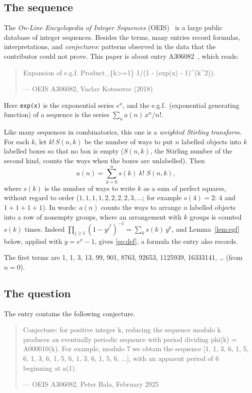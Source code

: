 \documentclass[11pt,a4paper]{article}
\theoremstyle{definition}
\theoremstyle{remark}
\begin{document}
\subsection{The sequence}\label{sec:sequence}
The \emph{On-Line Encyclopedia of Integer Sequences} (OEIS)~\cite{oeisdb} is a large public database of integer sequences.
Besides the terms, many entries record formulas, interpretations, and \emph{conjectures}: patterns observed in the data
that the contributor could not prove. This paper is about entry A306082~\cite{oeis}, which reads:
\begin{quote}\small\ttfamily\raggedright Expansion of e.g.f. Product\_\{k>=1\} 1/(1 - (exp(x) - 1)\^{}(k\^{}2)).\par\smallskip\hfill\textrm{--- OEIS A306082, Vaclav Kotesovec (2018)}\end{quote}

Here \texttt{exp(x)} is the exponential series $e^x$, and the e.g.f.\ (exponential generating function) of a
sequence is the series $\sum_na(n)\,x^n/n!$.

Like many sequences in combinatorics, this one is a \emph{weighted Stirling transform}. For each $k$, let
$k!\,S(n,k)$ be the number of ways to put $n$ labelled objects into $k$ labelled boxes so that no box is empty
($S(n,k)$, the Stirling number of the second kind, counts the ways when the boxes are unlabelled). Then
\begin{equation}\label{eq:def}
a(n)=\sum_{k=0}^{n}s(k)\;k!\;S(n,k),
\end{equation}
where $s(k)$ is the number of ways to write $k$ as a sum of perfect squares, without regard to order ($1,1,1,1,2,2,2,2,3,\dots$; for example $s(4)=2$: $4$ and $1+1+1+1$). In words: $a(n)$ counts the ways to arrange $n$ labelled objects into a row of
nonempty groups, where an arrangement with $k$ groups is counted $s(k)$ times. Indeed $\prod_{j\ge1}(1-y^{j^2})^{-1}=\sum_ks(k)\,y^k$, and Lemma~\ref{lem:egf} below, applied with $y=e^x-1$,
gives \eqref{eq:def}, a formula the entry also records.

The first terms are 1, 1, 3, 13, 99, 901, 8763, 92653, 1125939, 16333141, \dots{} (from $n=0$).

\subsection{The question}
The entry contains the following conjecture.
\begin{quote}\small\ttfamily\raggedright Conjecture: for positive integer k, reducing the sequence modulo k produces an eventually periodic sequence with period dividing phi(k) = A000010(k). For example, modulo 7 we obtain the sequence [1, 1, 3, 6, 1, 5, 6, 1, 3, 6, 1, 5, 6, 1, 3, 6, 1, 5, 6, ...], with an apparent period of 6 beginning at a(1).\par\smallskip\hfill\textrm{--- OEIS A306082, Peter Bala, February 2025}\end{quote}
\end{document}
